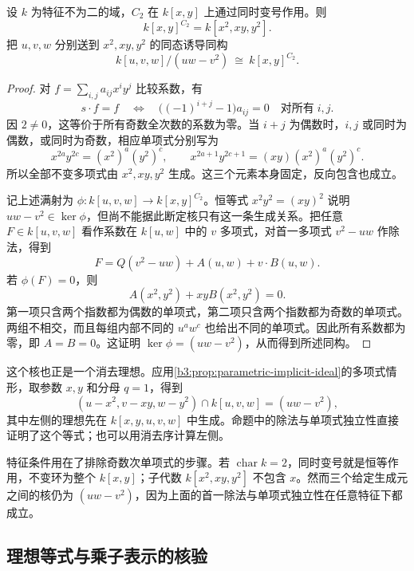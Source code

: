 \begin{proposition}\label{b3:prop:sign-invariant-presentation}
	设 \(k\) 为特征不为二的域，\(C_2\) 在 \(k[x,y]\) 上通过同时变号作用。则
	\[
		k[x,y]^{C_2}=k[x^2,xy,y^2].
	\]
	把 \(u,v,w\) 分别送到 \(x^2,xy,y^2\) 的同态诱导同构
	\begin{equation}\label{b3:eq:sign-invariant-presentation}
		k[u,v,w]/(uw-v^2)\ \cong\ k[x,y]^{C_2}.
	\end{equation}
\end{proposition}
\begin{proof}
	对 \(f=\sum_{i,j}a_{ij}x^iy^j\) 比较系数，有
	\[
		s\cdot f=f \quad\Longleftrightarrow\quad \bigl((-1)^{i+j}-1\bigr)a_{ij}=0\quad\text{对所有}\;i,j.
	\]
	因 \(2\ne0\)，这等价于所有奇数全次数的系数为零。当 \(i+j\) 为偶数时，\(i,j\) 或同时为偶数，或同时为奇数，相应单项式分别写为
	\[
		x^{2a}y^{2c}=(x^2)^a(y^2)^c,\qquad x^{2a+1}y^{2c+1}=(xy)(x^2)^a(y^2)^c.
	\]
	所以全部不变多项式由 \(x^2,xy,y^2\) 生成。这三个元素本身固定，反向包含也成立。

	记上述满射为 \(\phi:k[u,v,w]\to k[x,y]^{C_2}\)。恒等式 \(x^2y^2=(xy)^2\) 说明 \(uw-v^2\in\ker\phi\)，但尚不能据此断定核只有这一条生成关系。把任意 \(F\in k[u,v,w]\) 看作系数在 \(k[u,w]\) 中的 \(v\) 多项式，对首一多项式 \(v^2-uw\) 作除法，得到
	\[
		F=Q(v^2-uw)+A(u,w)+v\cdot B(u,w).
	\]
	若 \(\phi(F)=0\)，则
	\[
		A(x^2,y^2)+xyB(x^2,y^2)=0.
	\]
	第一项只含两个指数都为偶数的单项式，第二项只含两个指数都为奇数的单项式。两组不相交，而且每组内部不同的 \(u^aw^c\) 也给出不同的单项式。因此所有系数都为零，即 \(A=B=0\)。这证明 \(\ker\phi=(uw-v^2)\)，从而得到所述同构。
\end{proof}

这个核也正是一个消去理想。应用\cref{b3:prop:parametric-implicit-ideal}的多项式情形，取参数 \(x,y\) 和分母 \(q=1\)，得到
\[
	(u-x^2,v-xy,w-y^2)\cap k[u,v,w]=(uw-v^2),
\]
其中左侧的理想先在 \(k[x,y,u,v,w]\) 中生成。命题中的除法与单项式独立性直接证明了这个等式；也可以用消去序计算左侧。

\ProseParagraphBreak
特征条件用在了排除奇数次单项式的步骤。若 \(\operatorname{char}k=2\)，同时变号就是恒等作用，不变环为整个 \(k[x,y]\)；子代数 \(k[x^2,xy,y^2]\) 不包含 \(x\)。然而三个给定生成元之间的核仍为 \((uw-v^2)\)，因为上面的首一除法与单项式独立性在任意特征下都成立。

\subsection{理想等式与乘子表示的核验}
\label{b3:subsec:0803:04}
\label{b3:subsec:0803:certificate-verification}

